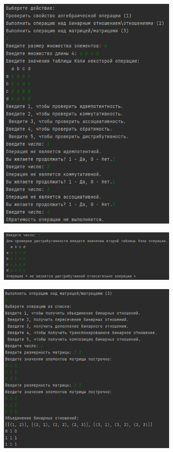 \documentclass[bachelor, och, labwork]{shiza}
\begin{document}
        \begin{figure}[H]
            \centering
            \includegraphics[width=0.8\textwidth]{pic/1.png}
            \caption{}
        \end{figure}

        \begin{figure}[H]
            \centering
            \includegraphics[width=0.8\textwidth]{pic/2.png}
            \caption{}
        \end{figure}

        \begin{figure}[H]
            \centering
            \includegraphics[width=0.8\textwidth]{pic/3.png}
            \caption{}
        \end{figure}
\end{document}
